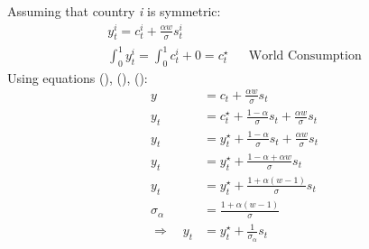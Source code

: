 \documentclass[12pt]{article}
\begin{document}
Assuming that country \textit{i} is symmetric:
\begin{align}
    y_t^i = c_t^i + \frac{\alpha w}{\sigma} s_t^i            &  &                          \\
    \int_{0}^{1} y_t^i = \int_{0}^{1} c_t^i + 0 =c_t^{\star} &  & \text{World Consumption}
\end{align}
Using equations (), (), ():
\begin{align}
    y                     & = c_t + \frac{\alpha w}{\sigma}s_t                                       \\
    y_t                   & = c_t^{\star} + \frac{1-\alpha}{\sigma}s_t + \frac{\alpha w}{\sigma} s_t \\
    y_t                   & = y_t^{\star} + \frac{1-\alpha}{\sigma}s_t + \frac{\alpha w}{\sigma} s_t \\
    y_t                   & = y_t^{\star} + \frac{1-\alpha + \alpha w}{\sigma}s_t                    \\
    y_t                   & = y_t^{\star} + \frac{1+ \alpha(w-1)}{\sigma}s_t                         \\
    \sigma_\alpha         & = \frac{1+ \alpha(w-1)}{\sigma}                                          \\
    \Rightarrow \quad y_t & =y^{\star}_t + \frac{1}{\sigma_\alpha}s_t
\end{align}
\end{document}
